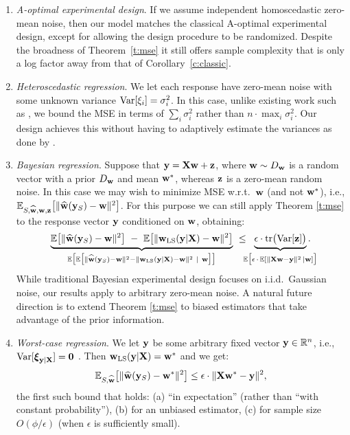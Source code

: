 \documentclass[12pt]{sty/colt2019/colt2018-arxiv}
\begin{document}
\begin{enumerate}
\item \textit{A-optimal experimental design}. If we assume
independent homoscedastic zero-mean 
noise, then
  our model matches the classical A-optimal
  experimental design, except for allowing the design procedure to be
  randomized. Despite the broadness of Theorem~\ref{t:mse} it still
  offers sample complexity that is only a log factor away from that of
  Corollary~\ref{c:classic}. 
  \item \textit{Heteroscedastic regression}. We let each
    response have zero-mean noise with some unknown variance
    $\mathrm{Var}[\xi_i]=\sigma_i^2$. In this case, unlike existing work such as
    \cite{regularized-volume-sampling}, we bound the MSE in terms of
    $\sum_i\sigma_i^2$ rather than $n\cdot\max_i\sigma_i^2$. Our
    design achieves this without having to adaptively estimate the
    variances as done by \cite{v-optimal}.
  \item \textit{Bayesian regression}. Suppose that
    $\mathbf y=\mathbf X\mathbf w+\mathbf z$, where $\mathbf w\sim D_\mathbf w$ is a random vector 
with a prior $D_\mathbf w$ and mean $\mathbf w^*$, whereas $\mathbf z$ is a zero-mean
random noise. In this case we may wish to minimize MSE w.r.t.~$\mathbf w$ (and not
$\mathbf w^*$),
i.e., $\mathbb E_{S,\widehat{\mathbf w},\mathbf w,\mathbf z}\big[\|\widehat{\mathbf w}(\mathbf y_S)-\mathbf w\|^2\big]$.
For this purpose we can still apply Theorem \ref{t:mse} to the response
vector $\mathbf y$ conditioned on $\mathbf w$, obtaining:
    \begin{align*}
      \underbrace{\E\big[\|\wbh(\y_S)-\w\|^2\big]
      \ -\ \E\big[\|\wols(\y|\X)-\w\|^2\big]}_{
      \E\big[\E\big[\|\wbh(\y_S)-\w\|^2-\|\wols(\y|\X)-\w\|^2\ |\ \w \big]\big]} 
      \ \leq\hspace{-2mm}\underbrace{\epsilon\cdot\tr\big(\Var[\z]\big)}_{\E\big[\epsilon\,\cdot\,\E[\|\X\w-\y\|^2\,|\w]\big]}\hspace{-4mm}.
    \end{align*}
    While traditional Bayesian experimental design
    \citep[see][]{bayesian-design-review} focuses on 
    i.i.d.~Gaussian noise, our results apply to arbitrary
    zero-mean noise. A natural future direction is to extend Theorem \ref{t:mse} to
    biased estimators that take advantage of the prior information.
  \item \textit{Worst-case regression}. We let $\mathbf y$ be some arbitrary
    fixed vector $\mathbf y\in\mathbb R^n$, i.e., $\mathrm{Var}[\boldsymbol\xi_{\mathbf y|\mathbf X}]=\mathbf 0$ \citep[a well-studied
    problem; see, e.g.,][]{drineas2006sampling}. Then $\mathbf w_{\mathrm{LS}}(\mathbf y|\mathbf X)=\mathbf w^*$
    and we get: 
    \begin{align*}
      \mathbb E_{S,\widehat{\mathbf w}}\big[\|\widehat{\mathbf w}(\mathbf y_S)-\mathbf w^*\|^2\big] \leq \epsilon\cdot \|\mathbf X\mathbf w^*-\mathbf y\|^2,
    \end{align*}
the first such bound that holds: (a) ``in
    expectation'' (rather than ``with constant probability''), (b) for an unbiased
    estimator, (c) for sample size $O(\phi/\epsilon)$ (when $\epsilon$
    is sufficiently small).
\end{enumerate}
\end{document}

